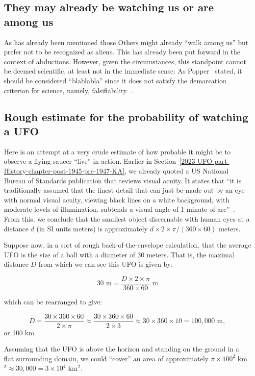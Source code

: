 \subsection{They may already be watching us or are among us}


As has already been mentioned those Others might already ``walk among us'' but prefer not to be recognized as aliens.
This has already been put forward in the context of abductions.
However, given the circumstances, this standpoint cannot be deemed scientific, at least not in the immediate sense:
As Popper~\cite{Popper-Kreuzer-1079} stated, it should be considered ``blablabla'' since it does not satisfy the demarcation criterion for science, namely, falsifiability~\cite{popper,popper-en}.


\subsection{Rough estimate for the probability of watching a UFO}

Here is an attempt at a very crude estimate of how probable it might be to observe a flying saucer ``live'' in action.
Earlier in Section~\ref{2023-UFO-part-History-chapter-post-1945-pre-1947-KA},
we already quoted a US National Bureau of Standards publication that reviews visual acuity.
It states that ``it
is traditionally assumed that the finest detail that can just be made out by an eye with normal visual acuity,
viewing black lines on a white background, with moderate levels of illumination, subtends a visual angle of
1 minute of arc''~\cite[p.~10]{Howett1983Jul}.
From this, we conclude that the smallest object discernable with human eyes at a distance $d$ (in SI units meters) is approximately
$d \times 2 \times \pi /(360\times 60)$ meters.

Suppose now, in a sort of rough back-of-the-envelope calculation, that the average UFO is the size of a ball with a diameter of 30 meters. That is, the maximal distance $D$ from which we can see this UFO is given by:

$$30\text{ m} = \frac{D \times 2 \times \pi}{360 \times 60}\text{ m}$$

which can be rearranged to give:

$$D = \frac{30 \times 360 \times 60}{2 \times \pi} \approx \frac{30 \times 360 \times 60}{2 \times 3} \approx 30 \times 360 \times 10 =
100,000\text{ m},$$ or 100 km.

Assuming that the UFO is above the horizon and standing on the ground in a flat surrounding domain, we could ``cover'' an area of approximately $\pi \times 100^2$ km$^2 \approx 30,000 = 3 \times 10^4$ km$^2$.

